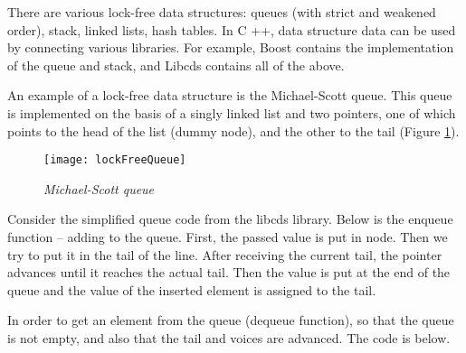 {\begin{itemize}
	\end{itemize}
	\par There are various lock-free data structures: queues (with strict and weakened order), stack, linked lists, hash tables. In C ++, data structure data can be used by connecting various libraries. For example, Boost contains the implementation of the queue and stack, and Libcds contains all of the above.
	\par An example of a lock-free data structure is the Michael-Scott queue. This queue is implemented on the basis of a singly linked list and two pointers, one of which points to the head of the list (dummy node), and the other to the tail (Figure \ref{lockFreeQueue:image}).
	\begin{figure}[H]
		\texttt{[image: lockFreeQueue]}
		\caption{\textit{Michael-Scott queue}}
		\label{lockFreeQueue:image}
	\end{figure}
	\par Consider the simplified queue code from the libcds library. Below is the enqueue function – adding to the queue. First, the passed value is put in node. Then we try to put it in the tail of the line. After receiving the current tail, the pointer advances until it reaches the actual tail. Then the value is put at the end of the queue and the value of the inserted element is assigned to the tail.
	\begin{figure}[H]
		
	\end{figure}
	\par In order to get an element from the queue (dequeue function), so that the queue is not empty, and also that the tail and voices are advanced. The code is below.
	\begin{figure}[H]
		
	\end{figure}
}